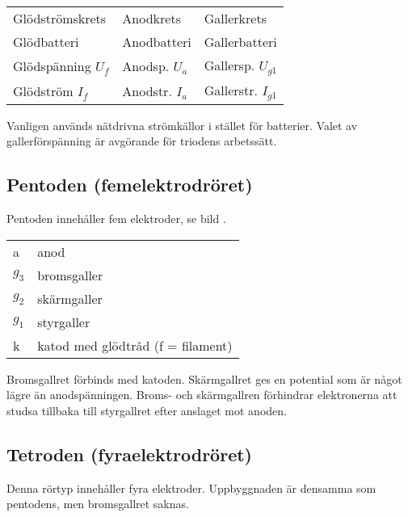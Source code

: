 \begin{center}
\begin{tabular}{lll}
Glödströmskrets      & Anodkrets        &  Gallerkrets \\
Glödbatteri          & Anodbatteri      &  Gallerbatteri \\
Glödspänning \(U_f\) & Anodsp. \(U_a\)  &  Gallersp. \(U_{g1}\) \\
Glödström \(I_f\)    & Anodstr. \(I_a\) &  Gallerstr. \(I_{g1}\) \\
\end{tabular}
\end{center}

\noindent
Vanligen används nätdrivna strömkällor i stället för batterier.
Valet av gallerförspänning är avgörande för triodens arbetssätt.

\subsection{Pentoden (femelektrodröret)}

Pentoden innehåller fem elektroder, se bild .

\begin{center}
\begin{tabular}{ll}
  a       & anod \\
  \(g_3\) & bromsgaller \\
  \(g_2\) & skärmgaller \\
  \(g_1\) & styrgaller \\
  k      & katod med glödtråd (f = filament) \\
\end{tabular}
\end{center}

Bromsgallret förbinds med katoden. Skärmgallret ges en potential som är något
lägre än anodspänningen.
Broms- och skärmgallren förhindrar elektronerna att studsa tillbaka till
styrgallret efter anslaget mot anoden.

\subsection{Tetroden (fyraelektrodröret)}

Denna rörtyp innehåller fyra elektroder. Uppbyggnaden är densamma som pentodens,
men bromsgallret saknas.


